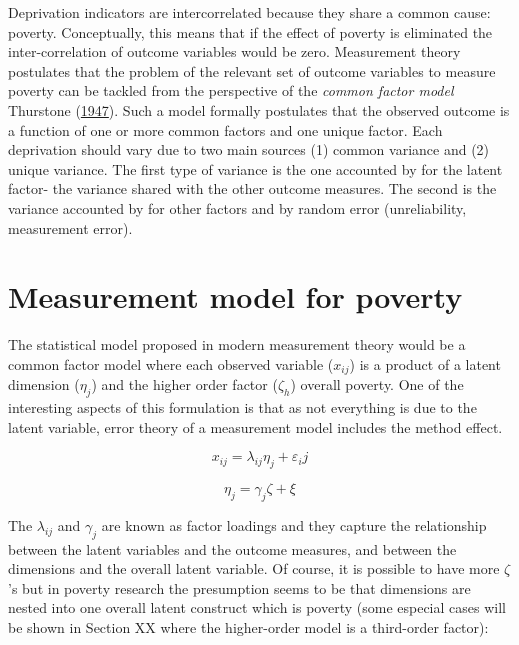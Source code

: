 \documentclass[]{book}
\begin{document}
Deprivation indicators are intercorrelated because they share a common cause: poverty. Conceptually, this means that if the effect of poverty is eliminated the inter-correlation of outcome variables would be zero. Measurement theory postulates that the problem of the relevant set of outcome variables to measure poverty can be tackled from the perspective of the \emph{common factor model} Thurstone (\protect\hyperlink{ref-Thurstone1947}{1947}). Such a model formally postulates that the observed outcome is a function of one or more common factors and one unique factor. Each deprivation should vary due to two main sources (1) common variance and (2) unique variance. The first type of variance is the one accounted by for the latent factor- the variance shared with the other outcome measures. The second is the variance accounted by for other factors and by random error (unreliability, measurement error).

\hypertarget{measurement-model-for-poverty}{%
\section{Measurement model for poverty}\label{measurement-model-for-poverty}}

The statistical model proposed in modern measurement theory would be a common factor model where each observed variable (\(x_{ij}\)) is a product of a latent dimension (\(\eta_j\)) and the higher order factor (\(\zeta_h\)) overall poverty. One of the interesting aspects of this formulation is that
as not everything is due to the latent variable, error theory of a measurement model includes the method effect.

\begin{equation}
\label{eq:model1}
 x_{ij} = \lambda_{ij} \eta_j + \varepsilon_ij  
\end{equation}

\begin{equation}
\label{eq:model2}
 \eta_j = \gamma_{j} \zeta  + \xi 
\end{equation}

The \(\lambda_{ij}\) and \(\gamma_{j}\) are known as factor loadings and they capture the relationship between the latent variables and the outcome measures, and between the dimensions and the overall latent variable. Of course, it is possible to have more \(\zeta\)'s but in poverty research the presumption seems to be that dimensions are nested into one overall latent construct which is poverty (some especial cases will be shown in Section XX where the higher-order model is a third-order factor):
\end{document}
